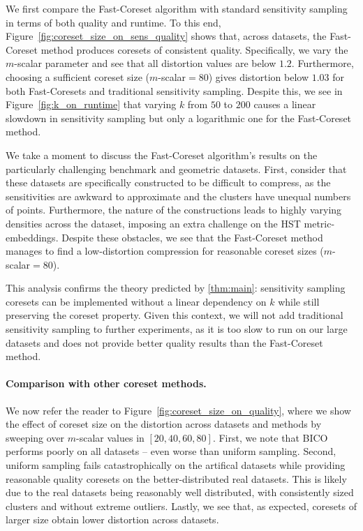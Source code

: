 We first compare the Fast-Coreset algorithm with standard sensitivity sampling in terms of both quality and runtime.  To this end,
Figure~\ref{fig:coreset_size_on_sens_quality} shows that, across datasets, the Fast-Coreset method produces coresets of consistent quality. Specifically, we
vary the $m$-scalar parameter and see that all distortion values are below $1.2$. Furthermore, choosing a sufficient coreset size ($m$-scalar$=80$) gives
distortion below $1.03$ for both Fast-Coresets and traditional sensitivity sampling. Despite this, we see in Figure~\ref{fig:k_on_runtime} that varying $k$ from
$50$ to $200$ causes a linear slowdown in sensitivity sampling but only a logarithmic one for the Fast-Coreset method.

We take a moment to discuss the Fast-Coreset algorithm's results on the particularly challenging benchmark and geometric datasets.  First, consider that these
datasets are specifically constructed to be difficult to compress, as the sensitivities are awkward to approximate and the clusters have unequal numbers of points.
Furthermore, the nature of the constructions leads to highly varying densities across the dataset, imposing an extra challenge on the HST metric-embeddings.
Despite these obstacles, we see that the Fast-Coreset method manages to find a low-distortion compression for reasonable coreset sizes ($m$-scalar$=80$).

This analysis confirms the theory predicted by \cref{thm:main}: sensitivity sampling coresets can be
implemented without a linear dependency on $k$ while still preserving the coreset property. Given this context, we will not add traditional sensitivity sampling
to further experiments, as it is too slow to run on our large datasets and does not provide better quality results than the Fast-Coreset method.

\paragraph*{Comparison with other coreset methods.}
We now refer the reader to Figure~\ref{fig:coreset_size_on_quality}, where we show the effect of coreset size on the distortion across datasets and methods by
sweeping over $m$-scalar values in $[20, 40, 60, 80]$. 
First, we note that BICO performs poorly on all datasets -- even worse than uniform sampling.
Second, uniform sampling fails catastrophically on the artifical datasets while providing reasonable quality coresets on the better-distributed real datasets.
This is likely due to the real datasets being reasonably well distributed, with consistently sized clusters and without extreme outliers.
Lastly, we see that, as expected, coresets of larger size obtain lower distortion across datasets.


